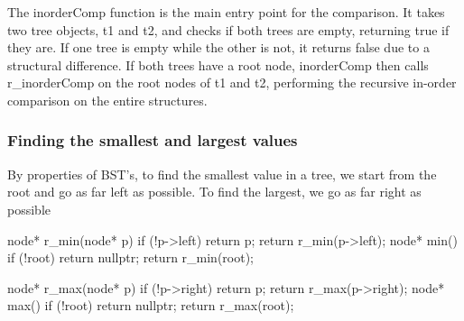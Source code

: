 \documentclass{report}
\begin{document}
    \bigbreak \noindent 
    The inorderComp function is the main entry point for the comparison. It takes two tree objects, t1 and t2, and checks if both trees are empty, returning true if they are. If one tree is empty while the other is not, it returns false due to a structural difference. If both trees have a root node, inorderComp then calls r\_inorderComp on the root nodes of t1 and t2, performing the recursive in-order comparison on the entire structures.

    \pagebreak 
    \subsubsection{Finding the smallest and largest values}
    \bigbreak \noindent 
    By properties of BST's, to find the smallest value in a tree, we start from the root and go as far left as possible. To find the largest, we go as far right as possible
    \bigbreak \noindent 
    \begin{cppcode}
        node* r_min(node* p) {
            if (!p->left) return p;
            return r_min(p->left);
        }
        node* min() {
            if (!root) return nullptr;
            return r_min(root);
        }

        node* r_max(node* p) {
            if (!p->right) return p;
            return r_max(p->right);
        }
        node* max() {
            if (!root) return nullptr;
            return r_max(root);
        }
    \end{cppcode}

    \pagebreak 
\end{document}

